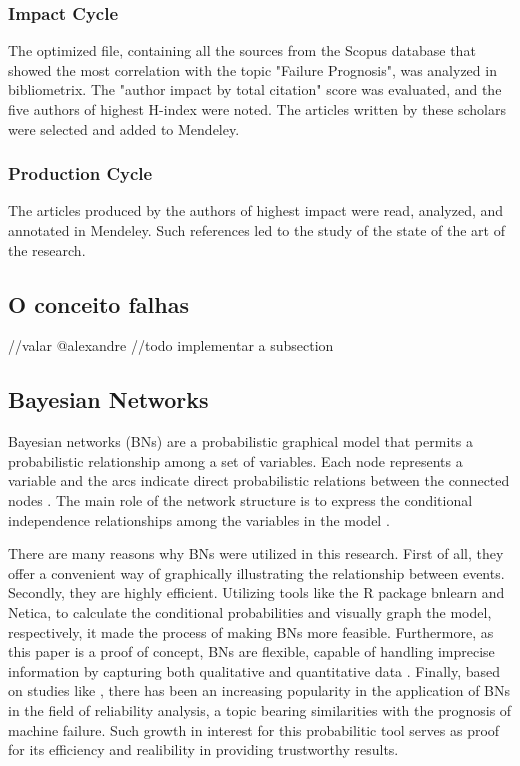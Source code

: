 \subsubsection{Impact Cycle}
The optimized file, containing all the sources from the Scopus database that showed the most correlation with the topic "Failure Prognosis", was analyzed in bibliometrix. 
The "author impact by total citation" score was evaluated, and the five authors of highest H-index were noted. The articles written by these scholars were selected and added to Mendeley.

\subsubsection{Production Cycle}
The articles produced by the authors of highest impact were read, analyzed, and annotated in Mendeley.
Such references led to the study of the state of the art of the research.

\subsection{O conceito falhas}
//valar @alexandre
//todo implementar a subsection


\subsection{Bayesian Networks}
Bayesian networks (BNs) are a probabilistic graphical model that  permits  a  probabilistic  relationship  among a set of variables.  Each  node  represents  a  variable  and  the  arcs  indicate  direct probabilistic  relations  between  the  connected  nodes \cite{hamza2015mapping}. The main role of the network structure is to express the conditional independence relationships among the variables in the model \cite{Understa77:online}.

There are many reasons why BNs were utilized in this research. First of all, they offer a convenient way of graphically illustrating the relationship between events. Secondly, they are highly efficient. Utilizing tools like the R package bnlearn and Netica, to calculate the conditional probabilities and visually graph the model, respectively, it made the process of making BNs more feasible. Furthermore, as this paper is a proof of concept, BNs are flexible, capable of handling imprecise information by capturing both qualitative and quantitative data \cite{PowerPoi65:online}. Finally, based on studies like \cite{langseth2007applications}, there has been an increasing popularity in the application of BNs in the field of reliability analysis, a topic bearing similarities with the prognosis of machine failure. Such growth in interest for this probabilitic tool serves as proof for its efficiency and realibility in providing trustworthy results.

